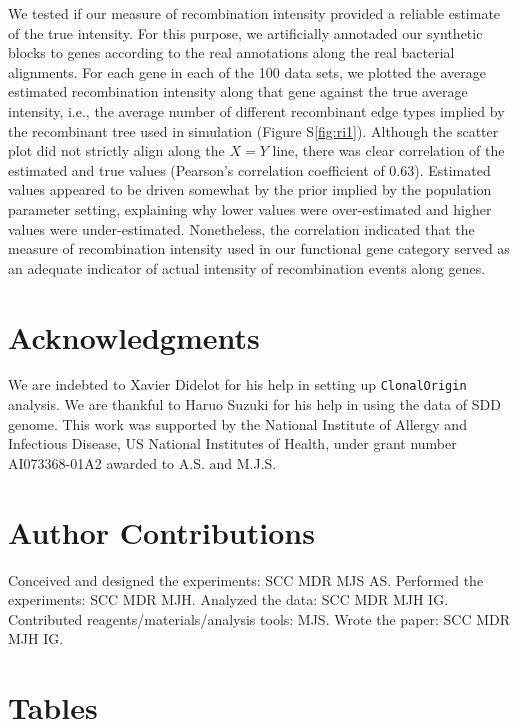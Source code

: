 \documentclass[english]{article}
\begin{document}
We tested if our measure of recombination intensity provided a reliable 
estimate of the true intensity. For this purpose, we artificially annotaded our 
synthetic blocks to genes according to the real annotations along the real 
bacterial alignments. For each gene in each of the 100 data sets, we plotted 
the average estimated recombination intensity along that gene against the true 
average intensity, i.e., the average number of different recombinant edge types 
implied by the recombinant tree used in simulation (Figure S\ref{fig:ri1}). 
Although the scatter plot did not strictly align along the $X=Y$ line, there 
was clear correlation of the estimated and true values (Pearson's correlation 
coefficient of 0.63). Estimated values appeared to be driven somewhat by the 
prior implied by the population parameter setting, explaining why lower values 
were over-estimated and higher values were under-estimated. Nonetheless, the 
correlation indicated that the measure of recombination intensity used in our 
functional gene category served as an adequate indicator of actual intensity of 
recombination events along genes.


\section*{Acknowledgments}

We are indebted to Xavier Didelot for his help in setting up \texttt{ClonalOrigin}
analysis.  We are thankful to Haruo Suzuki for his help
in using the data of SDD genome. This work was supported by the National
Institute of Allergy and Infectious Disease, US National Institutes
of Health, under grant number AI073368-01A2 awarded to A.S. and M.J.S.

\section*{Author Contributions}

Conceived and designed the experiments: SCC MDR MJS AS.
Performed the experiments: SCC MDR MJH.
Analyzed the data: SCC MDR MJH IG.
Contributed reagents/materials/analysis tools: MJS.
Wrote the paper: SCC MDR MJH IG.





\clearpage{}


\section*{Tables}
\end{document}
